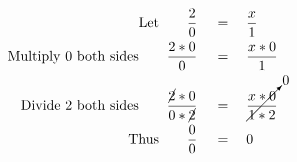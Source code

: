 \begin{align*}
\mathrm{Let}\qquad\frac{2}{0}\quad&\,=\quad\frac{x}{1}\\
\mathrm{Multiply~0~both~sides}\qquad\frac{2*0}{0}\quad&\,=\quad\frac{x*0}{1}\\
\mathrm{Divide~2~both~sides}\qquad\frac{\cancel{2}*0}{0*\cancel{2}}\quad&\,=\quad\cancelto{0}{\frac{x*0}{1*2}}\\
\mathrm{Thus}\qquad\frac{0}{0}\quad&\,=\quad0
\end{align*}
